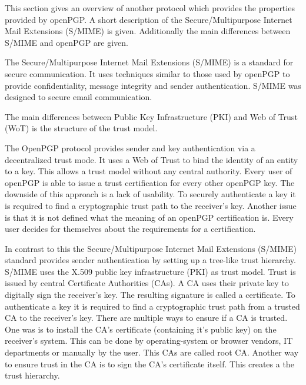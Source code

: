 This section gives an overview of another protocol which provides the properties provided by openPGP. A short description of the Secure/Multipurpose Internet Mail Extensions (S/MIME) is given. Additionally the main differences between S/MIME and openPGP are given.

The Secure/Multipurpose Internet Mail Extensions (S/MIME) is a standard for secure communication. It uses techniques similar to those used by openPGP to provide confidentiality, message integrity and sender authentication. S/MIME was designed to secure email communication. 

The main differences between Public Key Infrastructure (PKI) and Web of Trust (WoT) is the structure of the trust model. 

The OpenPGP protocol provides sender and key authentication via a decentralized trust mode. It uses a Web of Trust to bind the identity of an entity to a key. This allows a trust model without any central authority. Every user of openPGP is able to issue a trust certification for every other openPGP key. The downside of this approach is a lack of usability. To securely authenticate a key it is required to find a cryptographic trust path to the receiver's key. Another issue is that it is not defined what the meaning of an openPGP certification is. Every user decides for themselves about the requirements for a certification.

In contrast to this the Secure/Multipurpose Internet Mail Extensions (S/MIME) standard provides sender authentication by setting up a tree-like trust hierarchy. S/MIME uses the X.509 public key infrastructure (PKI) as trust model. Trust is issued by central Certificate Authorities (CAs). A CA uses their private key to digitally sign the receiver's key. The resulting signature is called a certificate. To authenticate a key it is required to find a cryptographic trust path from a trusted CA to the receiver's key. There are multiple ways to ensure if a CA is trusted. One was is to install the CA's certificate (containing it's public key) on the receiver's system. This can be done by operating-system or browser vendors, IT departments or manually by the user. This CAs are called root CA. Another way to ensure trust in the CA is to sign the CA's certificate itself. This creates a the trust hierarchy. 
